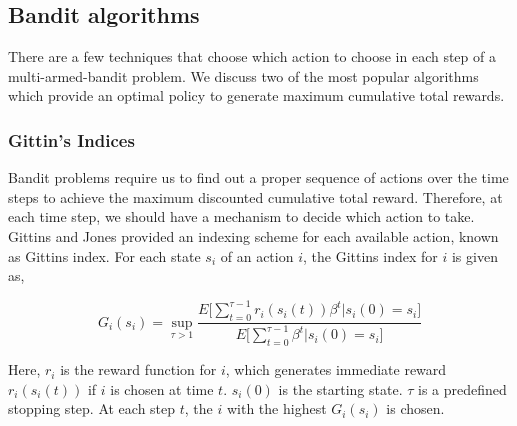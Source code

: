 \documentclass[english]{tktltiki}
\begin{document}
\subsection{Bandit algorithms}

There are a few techniques that choose which action to choose in each step of a multi-armed-bandit problem. We discuss two of the most popular algorithms which provide an optimal policy to generate maximum cumulative total rewards.

\subsubsection{Gittin's Indices}

Bandit problems require us to find out a proper sequence of actions over the time steps to achieve the maximum discounted cumulative total reward. Therefore, at each time step, we should have a mechanism to decide which action to take. Gittins and Jones \cite{gittins_indices} provided an indexing scheme for each available action, known as Gittins index. For each state $s_i$ of an action $i$, the Gittins index for $i$ is given as,

\begin{equation}
G_i(s_i) = \sup_{\tau > 1}{\frac{E\Big[\sum_{t = 0}^{\tau - 1} r_i(s_i(t))\beta^t | s_i(0) = s_i\Big]}{E\Big[\sum_{t = 0}^{\tau - 1}\beta^t | s_i(0) = s_i\Big]}}
\end{equation}

Here, $r_i$ is the reward function for $i$, which generates immediate reward  $r_i(s_i(t))$ if $i$ is chosen at time $t$. $s_i(0)$ is the starting state. $\tau$ is a predefined stopping step. At each step $t$, the $i$ with the highest $G_i(s_i)$ is chosen.
\end{document}
